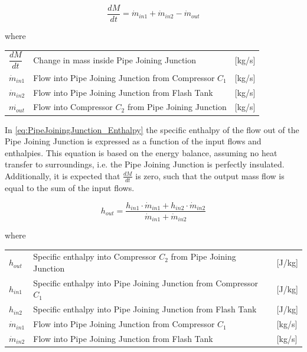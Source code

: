 \begin{equation} \label{eq:PipeJoiningJunction_ChangeOfMass}
	\frac{dM}{dt} = \dot{m}_{in1} + \dot{m}_{in2} - \dot{m}_{out}
\end{equation}


where

\begin{center}
	\begin{tabular}{l p{8cm} l}
		$\dfrac{dM}{dt}$ & Change in mass inside Pipe Joining Junction		 	& [\si{kg}/\si{s}]\\
		$\dot{m}_{in1}$ & Flow into Pipe Joining Junction from Compressor $ C_1 $ 		& [\si{kg}/\si{s}]\\
		$\dot{m}_{in2}$ & Flow into Pipe Joining Junction from Flash Tank 				& [\si{kg}/\si{s}]\\
		$\dot{m_{out}}$ & Flow into Compressor $ C_2 $ from Pipe Joining Junction		& [\si{kg}/\si{s}]\\
	\end{tabular}
\end{center}

In \cref{eq:PipeJoiningJunction_Enthalpy} the specific enthalpy of the flow out of the Pipe Joining Junction is expressed as a function of the input flows and enthalpies. This equation is based on the energy balance, assuming no heat transfer to surroundings, i.e. the Pipe Joining Junction is perfectly insulated. Additionally, it is expected that $\frac{dM}{dt}$ is zero, such that the output mass flow is equal to the sum of the input flows.

\begin{equation} \label{eq:PipeJoiningJunction_Enthalpy}
	h_{out} = \frac{h_{in1} \cdot \dot{m}_{in1} + h_{in2} \cdot \dot{m}_{in2}}{ \dot{m}_{in1} + \dot{m}_{in2} }
\end{equation}

where

\begin{center}
	\begin{tabular}{l p{10cm} l}
		$h_{out}$ 			& Specific enthalpy into Compressor $ C_2 $ from Pipe Joining Junction 			& [\si{J}/\si{kg}]\\
		$h_{in1}$ 			& Specific enthalpy into Pipe Joining Junction from Compressor $ C_1 $  					& [\si{J}/\si{kg}]\\
		$h_{in2}$ 			& Specific enthalpy into Pipe Joining Junction from Flash Tank   				& [\si{J}/\si{kg}]\\
		$\dot{m}_{in1}$ 	& Flow into Pipe Joining Junction from Compressor $ C_1 $ 		& [\si{kg}/\si{s}]\\
		$\dot{m}_{in2}$ 	& Flow into Pipe Joining Junction from Flash Tank 				& [\si{kg}/\si{s}]\\
	\end{tabular}
\end{center}



